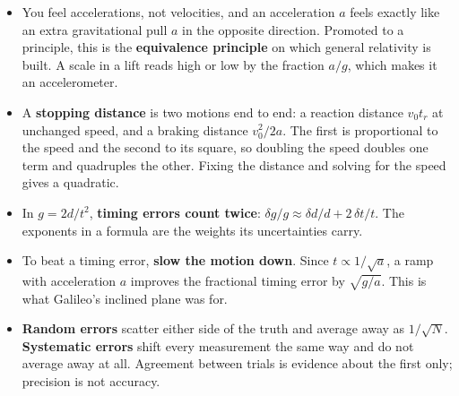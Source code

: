 \documentclass[11pt,twoside,openany]{book}
\begin{document}
\begin{itemize}
  \item You feel accelerations, not velocities, and an acceleration $a$ feels exactly like an extra gravitational pull $a$ in the opposite direction. Promoted to a principle, this is the \textbf{equivalence principle} on which general relativity is built. A scale in a lift reads high or low by the fraction $a/g$, which makes it an accelerometer.
  \item A \textbf{stopping distance} is two motions end to end: a reaction distance $v_0 t_r$ at unchanged speed, and a braking distance $v_0^2/2a$. The first is proportional to the speed and the second to its square, so doubling the speed doubles one term and quadruples the other. Fixing the distance and solving for the speed gives a quadratic.
  \item In $g = 2d/t^2$, \textbf{timing errors count twice}: $\delta g/g \approx \delta d/d + 2\,\delta t/t$. The exponents in a formula are the weights its uncertainties carry.
  \item To beat a timing error, \textbf{slow the motion down}. Since $t \propto 1/\sqrt{a}$, a ramp with acceleration $a$ improves the fractional timing error by $\sqrt{g/a}$. This is what Galileo's inclined plane was for.
  \item \textbf{Random errors} scatter either side of the truth and average away as $1/\sqrt{N}$. \textbf{Systematic errors} shift every measurement the same way and do not average away at all. Agreement between trials is evidence about the first only; precision is not accuracy.
\end{itemize}
\end{document}

